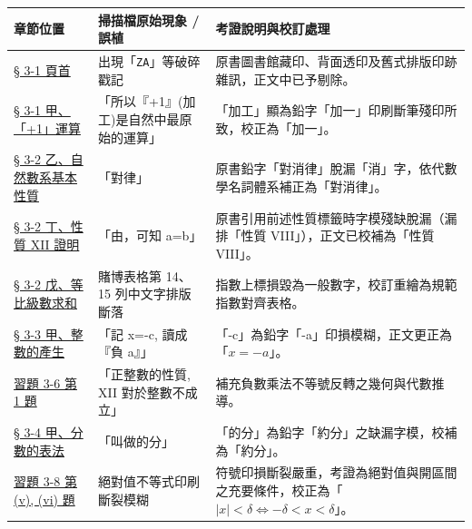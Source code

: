 \documentclass[a4paper,12pt,twoside]{article}
\begin{document}
\begin{table}[H]
\centering
\small
\renewcommand{\arraystretch}{1.35}
\begin{tabularx}{\textwidth}{|p{3.2cm}|p{3.6cm}|X|}
\hline
\textbf{章節位置} & \textbf{掃描檔原始現象 / 誤植} & \textbf{考證說明與校訂處理} \\ \hline

\hyperref[sec:3-1]{§ 3-1 頁首} & 
出現「\texttt{ZA}」等破碎戳記 & 
原書圖書館藏印、背面透印及舊式排版印跡雜訊，正文中已予剔除。 \\ \hline

\hyperref[subsec:plus_one]{§ 3-1 甲、「+1」運算} & 
「所以『+1』(加工)是自然中最原始的運算」 & 
「加工」顯為鉛字「加一」印刷斷筆殘印所致，校正為「加一」。 \\ \hline

\hyperref[subsec:nat_axioms]{§ 3-2 乙、自然數系基本性質} & 
「對律」 & 
原書鉛字「對消律」脫漏「消」字，依代數學名詞體系補正為「對消律」。 \\ \hline

\hyperref[prop:nat_xii]{§ 3-2 丁、性質 XII 證明} & 
「由，可知 a=b」 & 
原書引用前述性質標籤時字模殘缺脫漏（漏排「性質 VIII」），正文已校補為「性質 VIII」。 \\ \hline

\hyperref[ex:powers_of_two_sum]{§ 3-2 戊、等比級數求和} & 
賭博表格第 14、15 列中文字排版斷落 & 
指數上標損毀為一般數字，校訂重繪為規範指數對齊表格。 \\ \hline

\hyperref[subsec:int_generation]{§ 3-3 甲、整數的產生} & 
「記 x=-c, 讀成『負 a』」 & 
「-c」為鉛字「-a」印損模糊，正文更正為「$x = -a$」。 \\ \hline

\hyperref[sec:ex3-6]{習題 3-6 第 1 題} & 
「正整數的性質, XII 對於整數不成立」 & 
補充負數乘法不等號反轉之幾何與代數推導。 \\ \hline

\hyperref[subsec:fractions]{§ 3-4 甲、分數的表法} & 
「叫做的分」 & 
「的分」為鉛字「約分」之缺漏字模，校補為「約分」。 \\ \hline

\hyperref[sec:ex3-8]{習題 3-8 第 (v), (vi) 題} & 
絕對值不等式印刷斷裂模糊 & 
符號印損斷裂嚴重，考證為絕對值與開區間之充要條件，校正為「$|x| < \delta \iff -\delta < x < \delta$」。 \\ \hline

\end{tabularx}
\end{table}

\clearpage
\tableofcontents
\newpage


\end{document}
